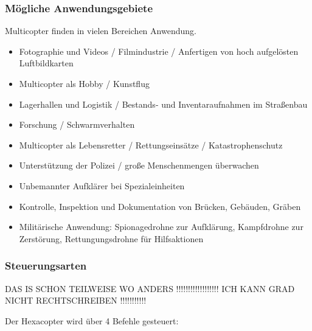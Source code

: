 
  \subsubsection{Mögliche Anwendungsgebiete}
  Multicopter finden in vielen Bereichen Anwendung. \cite{copterAnwendung}
  \begin{itemize}
    \item Fotographie und Videos / Filmindustrie / Anfertigen von hoch aufgelösten Luftbildkarten
    \item Multicopter als Hobby / Kunstflug
    \item Lagerhallen und Logistik / Bestands- und Inventaraufnahmen im Straßenbau
    \item Forschung / Schwarmverhalten
    \item Multicopter als Lebensretter / Rettungseinsätze / Katastrophenschutz
    \item Unterstützung der Polizei / große Menschenmengen überwachen
    \item Unbemannter Aufklärer bei Spezialeinheiten
    \item Kontrolle, Inspektion und Dokumentation von Brücken, Gebäuden, Gräben
    \item Militärische Anwendung: Spionagedrohne zur Aufklärung, Kampfdrohne zur Zerstörung, Rettungungsdrohne für Hilfsaktionen
  \end{itemize}


  \subsubsection{Steuerungsarten}

  DAS IS SCHON TEILWEISE WO ANDERS !!!!!!!!!!!!!!!!!!
  ICH KANN GRAD NICHT RECHTSCHREIBEN !!!!!!!!!!!

  Der Hexacopter wird über 4 Befehle gesteuert: \cite{GrundlagenMulticopter}

